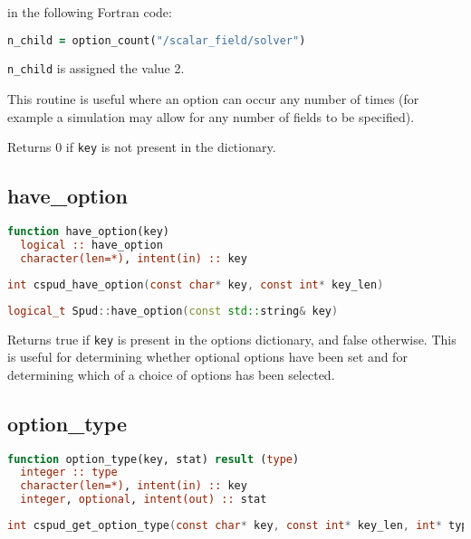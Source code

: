 \documentclass[a4paper, 11pt]{book}
\begin{document}
in the following Fortran code:

\begin{lstlisting}[language=fortran]
n_child = option_count("/scalar_field/solver")
\end{lstlisting}

\lstinline+n_child+ is assigned the value 2.

This routine is useful where an option can occur any number of times (for
example a simulation may allow for any number of fields to be specified).

Returns 0 if \lstinline+key+ is not present in the dictionary.

\subsection{have\_option}

\begin{lstlisting}[language=fortran]
function have_option(key)
  logical :: have_option
  character(len=*), intent(in) :: key
\end{lstlisting}

\begin{lstlisting}[language=C]
int cspud_have_option(const char* key, const int* key_len)
\end{lstlisting}

\begin{lstlisting}[language=C++]
logical_t Spud::have_option(const std::string& key)
\end{lstlisting}

Returns true if \lstinline+key+ is present in the options dictionary, and
false otherwise. This is useful for determining whether optional options have
been set and for determining which of a choice of options has been selected.

\subsection{option\_type}\label{sec:option_type}

\begin{lstlisting}[language=fortran]
function option_type(key, stat) result (type)
  integer :: type
  character(len=*), intent(in) :: key
  integer, optional, intent(out) :: stat
\end{lstlisting}

\begin{lstlisting}[language=C]
int cspud_get_option_type(const char* key, const int* key_len, int* type)
\end{lstlisting}
\end{document}
